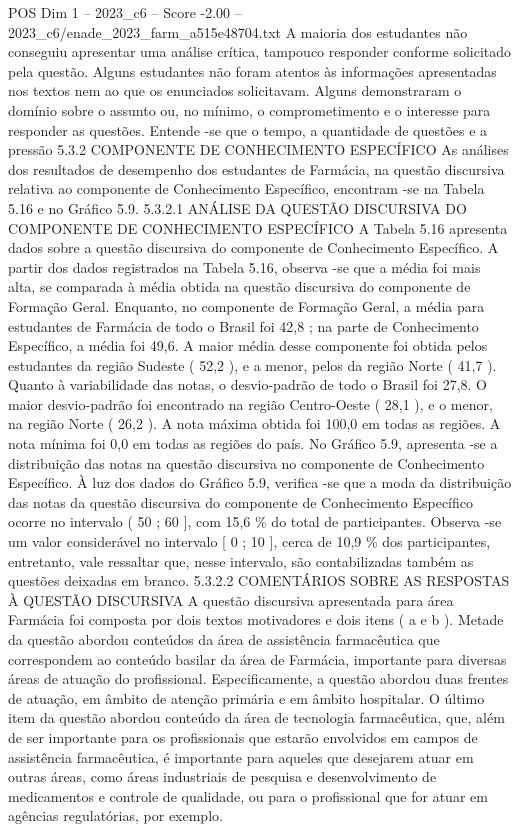 \begin{textsample}{POS Dim 1 – 2023\_c6 – Score -2.00 – 2023\_c6/enade\_2023\_farm\_a515e48704.txt}
A maioria dos estudantes não conseguiu apresentar uma análise crítica, tampouco responder conforme solicitado pela questão.
Alguns estudantes não foram atentos às informações apresentadas nos textos nem ao que os enunciados solicitavam.
Alguns demonstraram o domínio sobre o assunto ou, no mínimo, o comprometimento e o interesse para responder as questões.
Entende -se que o tempo, a quantidade de questões e a pressão 5.3.2 COMPONENTE DE CONHECIMENTO ESPECÍFICO As análises dos resultados de desempenho dos estudantes de Farmácia, na questão discursiva relativa ao componente de Conhecimento Específico, encontram -se na Tabela 5.16 e no Gráfico 5.9. 5.3.2.1 ANÁLISE DA QUESTÃO DISCURSIVA DO COMPONENTE DE CONHECIMENTO ESPECÍFICO A Tabela 5.16 apresenta dados sobre a questão discursiva do componente de Conhecimento Específico.
A partir dos dados registrados na Tabela 5.16, observa -se que a média foi mais alta, se comparada à média obtida na questão discursiva do componente de Formação Geral.
Enquanto, no componente de Formação Geral, a média para estudantes de Farmácia de todo o Brasil foi 42,8 ; na parte de Conhecimento Específico, a média foi 49,6.
A maior média desse componente foi obtida pelos estudantes da região Sudeste ( 52,2 ), e a menor, pelos da região Norte ( 41,7 ).
Quanto à variabilidade das notas, o desvio-padrão de todo o Brasil foi 27,8.
O maior desvio-padrão foi encontrado na região Centro-Oeste ( 28,1 ), e o menor, na região Norte ( 26,2 ).
A nota máxima obtida foi 100,0 em todas as regiões.
A nota mínima foi 0,0 em todas as regiões do país.
No Gráfico 5.9, apresenta -se a distribuição das notas na questão discursiva no componente de Conhecimento Específico.
À luz dos dados do Gráfico 5.9, verifica -se que a moda da distribuição das notas da questão discursiva do componente de Conhecimento Específico ocorre no intervalo ( 50 ; 60 ], com 15,6 \% do total de participantes.
Observa -se um valor considerável no intervalo [ 0 ; 10 ], cerca de 10,9 \% dos participantes, entretanto, vale ressaltar que, nesse intervalo, são contabilizadas também as questões deixadas em branco. 5.3.2.2 COMENTÁRIOS SOBRE AS RESPOSTAS À QUESTÃO DISCURSIVA A questão discursiva apresentada para área Farmácia foi composta por dois textos motivadores e dois itens ( a e b ).
Metade da questão abordou conteúdos da área de assistência farmacêutica que correspondem ao conteúdo basilar da área de Farmácia, importante para diversas áreas de atuação do profissional.
Especificamente, a questão abordou duas frentes de atuação, em âmbito de atenção primária e em âmbito hospitalar.
O último item da questão abordou conteúdo da área de tecnologia farmacêutica, que, além de ser importante para os profissionais que estarão envolvidos em campos de assistência farmacêutica, é importante para aqueles que desejarem atuar em outras áreas, como áreas industriais de pesquisa e desenvolvimento de medicamentos e controle de qualidade, ou para o profissional que for atuar em agências regulatórias, por exemplo.

\end{textsample}
